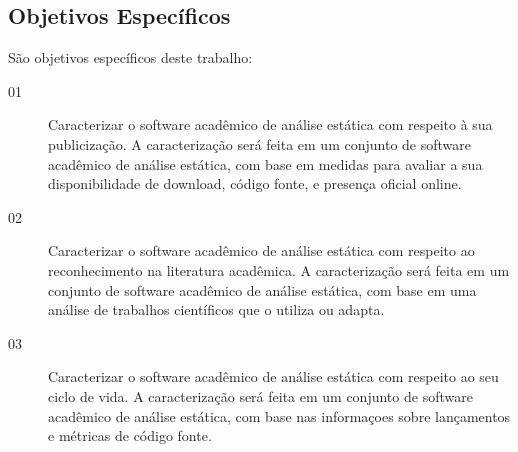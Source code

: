 %

\subsection{Objetivos Específicos}

São objetivos específicos deste trabalho:


\begin{description}
  \item [01]
    Caracterizar o software acadêmico de análise estática com respeito à sua
    publicização.
    A caracterização será feita em um conjunto de software acadêmico de análise
    estática, com base em medidas para avaliar a sua disponibilidade de
    download, código fonte, e presença oficial online.
  \item [02]
    Caracterizar o software acadêmico de análise estática com respeito ao
    reconhecimento na literatura acadêmica.
    A caracterização será feita em um conjunto de software acadêmico de análise
    estática, com base em uma análise de trabalhos científicos que o utiliza ou
    adapta.
  \item [03]
    Caracterizar o software acadêmico de análise estática com respeito ao
    seu ciclo de vida.
    A caracterização será feita em um conjunto de software acadêmico de análise
    estática, com base nas informaçoes sobre lançamentos e métricas de código
    fonte.
\end{description}


